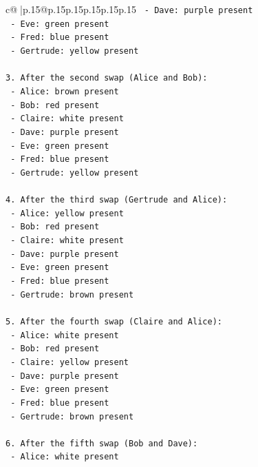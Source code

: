\documentclass{article}
\begin{document}
{\begin{supertabular}{c@{$\;$}|p{.15\linewidth}@{}p{.15\linewidth}p{.15\linewidth}p{.15\linewidth}p{.15\linewidth}p{.15\linewidth}}
{{{\texttt{   {-} Dave: purple present} \\
\texttt{   {-} Eve: green present} \\
\texttt{   {-} Fred: blue present} \\
\texttt{   {-} Gertrude: yellow present} \\
\\ 
\texttt{3. After the second swap (Alice and Bob):} \\
\texttt{   {-} Alice: brown present} \\
\texttt{   {-} Bob: red present} \\
\texttt{   {-} Claire: white present} \\
\texttt{   {-} Dave: purple present} \\
\texttt{   {-} Eve: green present} \\
\texttt{   {-} Fred: blue present} \\
\texttt{   {-} Gertrude: yellow present} \\
\\ 
\texttt{4. After the third swap (Gertrude and Alice):} \\
\texttt{   {-} Alice: yellow present} \\
\texttt{   {-} Bob: red present} \\
\texttt{   {-} Claire: white present} \\
\texttt{   {-} Dave: purple present} \\
\texttt{   {-} Eve: green present} \\
\texttt{   {-} Fred: blue present} \\
\texttt{   {-} Gertrude: brown present} \\
\\ 
\texttt{5. After the fourth swap (Claire and Alice):} \\
\texttt{   {-} Alice: white present} \\
\texttt{   {-} Bob: red present} \\
\texttt{   {-} Claire: yellow present} \\
\texttt{   {-} Dave: purple present} \\
\texttt{   {-} Eve: green present} \\
\texttt{   {-} Fred: blue present} \\
\texttt{   {-} Gertrude: brown present} \\
\\ 
\texttt{6. After the fifth swap (Bob and Dave):} \\
\texttt{   {-} Alice: white present} \\
}}}
\end{supertabular}}
\end{document}
